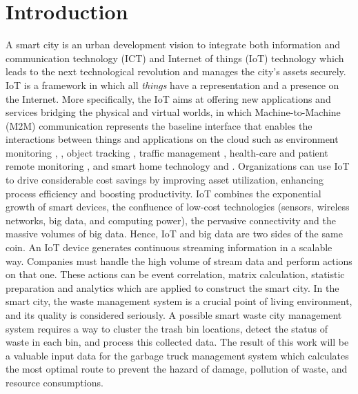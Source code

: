 \documentclass[conference]{IEEEtran}
\begin{document}
\section{Introduction}
\label{section1}
A smart city is an urban development vision to integrate both information and communication technology (ICT) and Internet of things (IoT) technology which leads to the next technological revolution \cite{Delicato2013}  and manages the city's assets securely. IoT is a framework in which all \textit{things} have a representation and a presence on the Internet. More specifically, the IoT aims at offering new applications and services bridging the physical and virtual worlds, in which Machine-to-Machine (M2M) communication represents the baseline interface that enables the interactions between things and applications on the cloud such as environment monitoring \cite{Lazarescu2013}, \cite{Kelly2013}, object tracking \cite{Gama2012}, traffic management \cite{Foschini2011}, health-care and patient remote monitoring \cite{Jara2011}, and smart home technology \cite{Tozlu2012} and \cite{Li2011}. Organizations can use IoT to drive considerable cost savings by improving asset utilization, enhancing process efficiency and boosting productivity. IoT combines the exponential growth of smart devices,  the confluence of low-cost technologies (sensors, wireless networks, big data, and computing power), the pervasive connectivity and the massive volumes of big data. Hence, IoT and big data are two sides of the same coin. An IoT device generates continuous streaming information in a scalable way. Companies must handle the high volume of stream data and perform actions on that one. These actions can be event correlation, matrix calculation, statistic preparation and analytics which are applied to construct the smart city. In the smart city, the waste management system is a crucial point of living environment, and its quality is considered seriously. A possible smart waste city management system requires a way to cluster the trash bin locations, detect the status of waste in each bin, and process this collected data. The result of this work will be a valuable input data for the garbage truck management system which calculates the most optimal route to prevent the hazard of damage, pollution of waste, and resource consumptions. 
\end{document}
